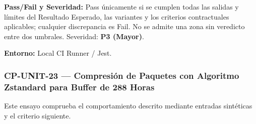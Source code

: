 \par\noindent\textbf{Pass/Fail y Severidad:} Pass únicamente si se cumplen todas las salidas y límites del Resultado Esperado, las variantes y los criterios contractuales aplicables; cualquier discrepancia es Fail. No se admite una zona sin veredicto entre dos umbrales. Severidad: \textbf{P3 (Mayor)}.\par
\par\noindent\textbf{Entorno:} Local CI Runner / Jest.\par






\subsubsection*{CP-UNIT-23 — Compresión de Paquetes con Algoritmo Zstandard para Buffer de 288 Horas}\label{sec:9-cp-unit-23}
Este ensayo comprueba el comportamiento descrito mediante entradas sintéticas y el criterio siguiente.

